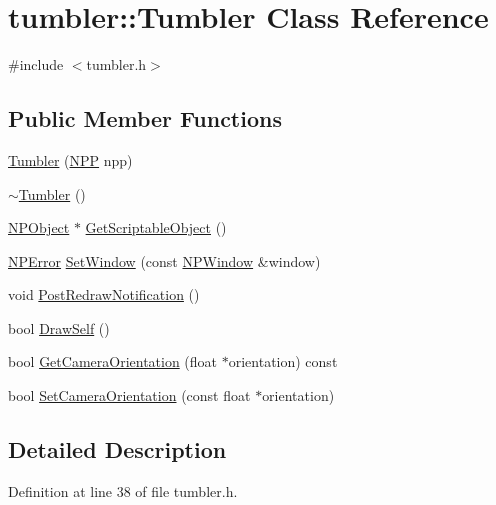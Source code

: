 \hypertarget{classtumbler_1_1_tumbler}{
\section{tumbler::Tumbler Class Reference}
\label{classtumbler_1_1_tumbler}
}


{\ttfamily \#include $<$tumbler.h$>$}

\subsection*{Public Member Functions}
\begin{DoxyCompactItemize}
\item 
\hyperlink{classtumbler_1_1_tumbler_a4f5dd0baa068ccb8214b0e477f7cd94b}{Tumbler} (\hyperlink{struct___n_p_p}{NPP} npp)
\item 
\hyperlink{classtumbler_1_1_tumbler_a80349e180aa825c15d63bada00c6e9a8}{$\sim$Tumbler} ()
\item 
\hyperlink{struct_n_p_object}{NPObject} $\ast$ \hyperlink{classtumbler_1_1_tumbler_ad438453c62d1edcbdd5cb39a38143a0b}{GetScriptableObject} ()
\item 
\hyperlink{npapi_8h_a56715bc92ac93f0447a05f852ce18828}{NPError} \hyperlink{classtumbler_1_1_tumbler_a6aba2f3cfa10be35c0a789924343b1b0}{SetWindow} (const \hyperlink{struct___n_p_window}{NPWindow} \&window)
\item 
void \hyperlink{classtumbler_1_1_tumbler_ab721f5f95ce020ce6680033771ed4577}{PostRedrawNotification} ()
\item 
bool \hyperlink{classtumbler_1_1_tumbler_a8da0b0b0e85708487c55f6ca5c999da1}{DrawSelf} ()
\item 
bool \hyperlink{classtumbler_1_1_tumbler_a5e01d6cde9baab4e5c2aa4b834733bf2}{GetCameraOrientation} (float $\ast$orientation) const 
\item 
bool \hyperlink{classtumbler_1_1_tumbler_a2657d32f15492fc56406d1750172ca8c}{SetCameraOrientation} (const float $\ast$orientation)
\end{DoxyCompactItemize}


\subsection{Detailed Description}


Definition at line 38 of file tumbler.h.



